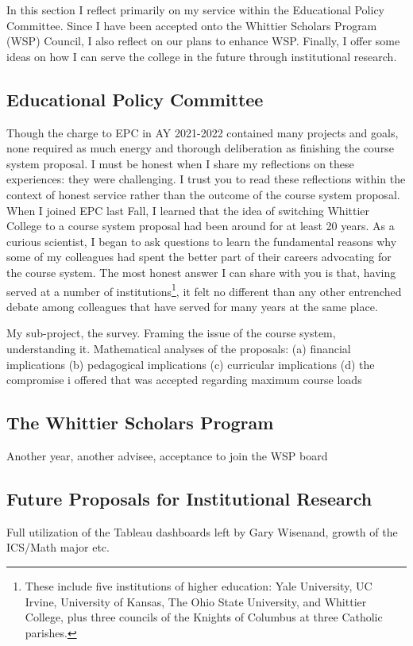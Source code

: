 \documentclass[../../../main.tex]{subfiles}
\begin{document}
\label{sec:committee_service}

In this section I reflect primarily on my service within the Educational Policy Committee.  Since I have been accepted onto the Whittier Scholars Program (WSP) Council, I also reflect on our plans to enhance WSP.  Finally, I offer some ideas on how I can serve the college in the future through institutional research.

\subsection{Educational Policy Committee}

Though the charge to EPC in AY 2021-2022 contained many projects and goals, none required as much energy and thorough deliberation as finishing the course system proposal.  I must be honest when I share my reflections on these experiences: they were challenging.  I trust you to read these reflections within the context of honest service rather than the outcome of the course system proposal.
\\
\vspace{0.25cm}
When I joined EPC last Fall, I learned that the idea of switching Whittier College to a course system proposal had been around for at least 20 years.  As a curious scientist, I began to ask questions to learn the fundamental reasons why some of my colleagues had spent the better part of their careers advocating for the course system.  The most honest answer I can share with you is that, having served at a number of institutions\footnote{These include five institutions of higher education: Yale University, UC Irvine, University of Kansas, The Ohio State University, and Whittier College, plus three councils of the Knights of Columbus at three Catholic parishes.}, it felt no different than any other entrenched debate among colleagues that have served for many years at the same place.
\\
\vspace{0.25cm}

My sub-project, the survey.  Framing the issue of the course system, understanding it.  Mathematical analyses of the proposals: (a) financial implications (b) pedagogical implications (c) curricular implications (d) the compromise i offered that was accepted regarding maximum course loads

\subsection{The Whittier Scholars Program}

Another year, another advisee, acceptance to join the WSP board

\subsection{Future Proposals for Institutional Research}

Full utilization of the Tableau dashboards left by Gary Wisenand, growth of the ICS/Math major etc.
\end{document}
